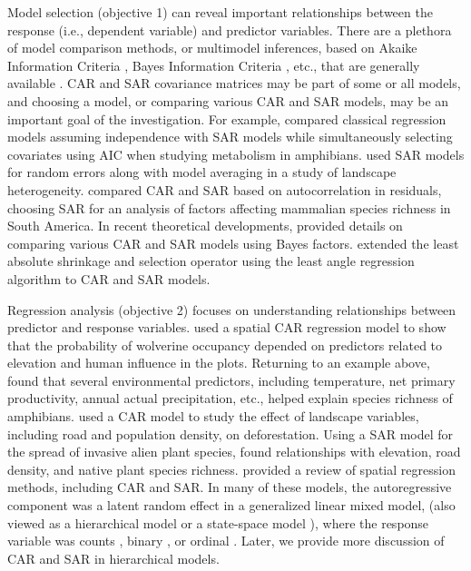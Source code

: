 Model selection (objective 1) can reveal important relationships between the response (i.e., dependent variable) and predictor variables.  There are a plethora of model comparison methods, or multimodel inferences, based on Akaike Information Criteria \citep[AIC,][]{Akai:Info:1973}, Bayes Information Criteria \citep[BIC,][]{Schw:esti:1978}, etc., that are generally available \citep[e.g.,][]{Burn:Ande:mode:2002,Hoot:Hobb:guid:2015}.  CAR and SAR covariance matrices may be part of some or all models, and choosing a model, or comparing various CAR and SAR models, may be an important goal of the investigation. For example, \citet{Cass:Dini:Rang:Thia:spat:2007} compared classical regression models assuming independence with SAR models while simultaneously selecting covariates using AIC when studying metabolism in amphibians. \citet{Qui:Turn:impo:2015} used SAR models for random errors along with model averaging in a study of landscape heterogeneity. \citet{Togn:Kelt:anal:2004} compared CAR and SAR based on autocorrelation in residuals, choosing SAR for an analysis of factors affecting mammalian species richness in South America.  In recent theoretical developments, \citet{Song:DeOl:Baye:2012} provided details on comparing various CAR and SAR models using Bayes factors. \citet{Zhu:Huan:Reye:sele:2010} extended the least absolute shrinkage and selection operator \citep[LASSO, ][]{Tibs:regr:1996} using the least angle regression algorithm \citep[LARS, ][]{Efro:Hast:John:Tibs:leas:2004} to CAR and SAR models. 

Regression analysis (objective 2) focuses on understanding relationships between predictor and response variables.  \citet{Gard:Lawl:Ver:Mago:Kell:coar:2010} used a spatial CAR regression model to show that the probability of wolverine occupancy depended on predictors related to elevation and human influence in the plots. Returning to an example above, \citet{Cass:Dini:Rang:Thia:spat:2007} found that several environmental predictors, including temperature, net primary productivity, annual actual precipitation, etc., helped explain species richness of amphibians.  \citet{Agar:Sila:Gelf:Dewa:Mick:trop:2005} used a CAR model to study the effect of landscape variables, including road and population density, on deforestation.  Using a SAR model for the spread of invasive alien plant species, \citet{Dark:biog:2004} found relationships with elevation, road density, and native plant species richness. \citet{Beal:Lenn:Year:Brew:Elst:regr:2010} provided a review of spatial regression methods, including CAR and SAR.  In many of these models, the autoregressive component was a latent random effect in a generalized linear mixed model, (also viewed as a hierarchical model \citep{Cres:Cald:Clar:VerH:acco:2009} or a state-space model \citep{deVa:Hast:fitt:2002}), where the response variable was counts \citep{Clay:Kald:empi:1987}, binary \citep{Gard:Lawl:Ver:Mago:Kell:coar:2010}, or ordinal \citep{Agar:Sila:Gelf:Dewa:Mick:trop:2005}.  Later, we provide more discussion of CAR and SAR in hierarchical models.

